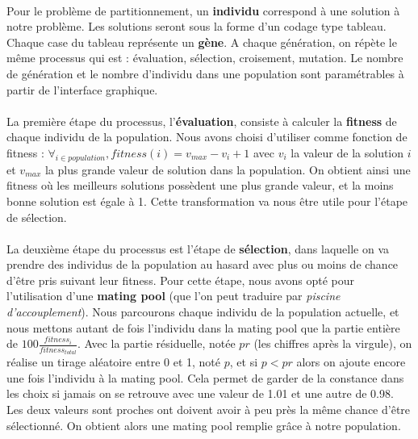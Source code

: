 \documentclass[12pt]{article}
\begin{document}
\paragraph{}Pour le problème de partitionnement, un \textbf{individu} correspond à une solution à notre problème. Les solutions seront sous la forme d'un codage type tableau. Chaque case du tableau représente un \textbf{gène}. A chaque génération, on répète le même processus qui est : évaluation, sélection, croisement, mutation. Le nombre de génération et le nombre d'individu dans une population sont paramétrables à partir de l'interface graphique.

\paragraph{}La première étape du processus, l'\textbf{évaluation}, consiste à calculer la \textbf{fitness} de chaque individu de la population. Nous avons choisi d'utiliser comme fonction de fitness : $\forall_{i \in population}, fitness(i) = v_{max} - v_i + 1$ avec $v_i$ la valeur de la solution $i$ et $v_{max}$ la plus grande valeur de solution dans la population. On obtient ainsi une fitness où les meilleurs solutions possèdent une plus grande valeur, et la moins bonne solution est égale à 1. Cette transformation va nous être utile pour l'étape de sélection.

\paragraph{}La deuxième étape du processus est l'étape de \textbf{sélection}, dans laquelle on va prendre des individus de la population au hasard avec plus ou moins de chance d'être pris suivant leur fitness. Pour cette étape, nous avons opté pour l'utilisation d'une \textbf{mating pool} (que l'on peut traduire par \textit{piscine d'accouplement}). Nous parcourons chaque individu de la population actuelle, et nous mettons autant de fois l'individu dans la mating pool que la partie entière de $100\frac{fitness_i}{fitness_{total}}$. Avec la partie résiduelle, notée $pr$ (les chiffres après la virgule), on réalise un tirage aléatoire entre 0 et 1, noté $p$, et si $p < pr$ alors on ajoute encore une fois l'individu à la mating pool. Cela permet de garder de la constance dans les choix si jamais on se retrouve avec une valeur de 1.01 et une autre de 0.98. Les deux valeurs sont proches ont doivent avoir à peu près la même chance d'être sélectionné. On obtient alors une mating pool remplie grâce à notre population.
\end{document}
